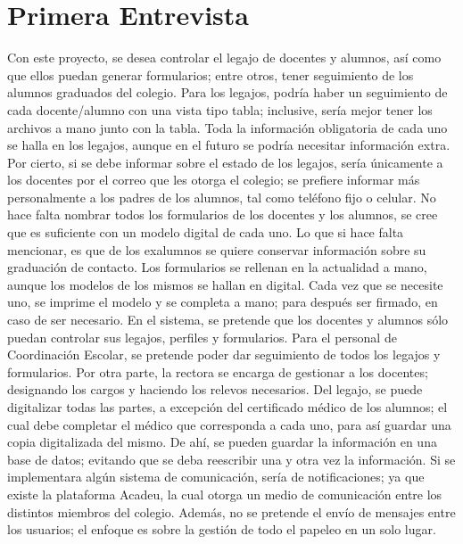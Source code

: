 \section{Primera Entrevista}
\normalsize{ \indent
Con este proyecto, se desea controlar el legajo de
docentes y alumnos, así como que ellos puedan generar
formularios; entre otros, tener seguimiento de los
alumnos graduados del colegio. Para los legajos, podría
haber un seguimiento de cada docente/alumno con una
vista tipo tabla; inclusive, sería mejor tener los
archivos a mano junto con la tabla.
}
\newline
\normalsize{ \indent
Toda la información obligatoria de cada uno se halla en
los legajos, aunque en el futuro se podría necesitar
información extra. Por cierto, si se debe informar sobre
el estado de los legajos, sería únicamente a los docentes
por el correo que les otorga el colegio; se prefiere
informar más personalmente a los padres de los alumnos,
tal como teléfono fijo o celular.
}
\newline
\normalsize{ \indent
No hace falta nombrar todos los formularios de los
docentes y los alumnos, se cree que es suficiente con un
modelo digital de cada uno. Lo que si hace falta mencionar,
es que de los exalumnos se quiere conservar información
sobre su graduación de contacto.
}
\newline
\normalsize{ \indent
Los formularios se rellenan en la actualidad a mano,
aunque los modelos de los mismos se hallan en digital.
Cada vez que se necesite uno, se imprime el modelo y se
completa a mano; para después ser firmado, en caso de ser
necesario.
}
\newline
\normalsize{ \indent
En el sistema, se pretende que los docentes y alumnos
sólo puedan controlar sus legajos, perfiles y formularios.
Para el personal de Coordinación Escolar, se pretende
poder dar seguimiento de todos los legajos y formularios.
Por otra parte, la rectora se encarga de gestionar a los
docentes; designando los cargos y haciendo los relevos
necesarios.
}
\newline
\normalsize{ \indent
Del legajo, se puede digitalizar todas las partes, a
excepción del certificado médico de los alumnos; el cual
debe completar el médico que corresponda a cada uno, para
así guardar una copia digitalizada del mismo. De ahí, se
pueden guardar la información en una base de datos;
evitando que se deba reescribir una y otra vez la
información.
}
\newline
\normalsize{ \indent
Si se implementara algún sistema de comunicación, sería
de notificaciones; ya que existe la plataforma Acadeu,
la cual otorga un medio de comunicación entre los distintos
miembros del colegio. Además, no se pretende el envío de
mensajes entre los usuarios; el enfoque es sobre la gestión
de todo el papeleo en un solo lugar.
}
